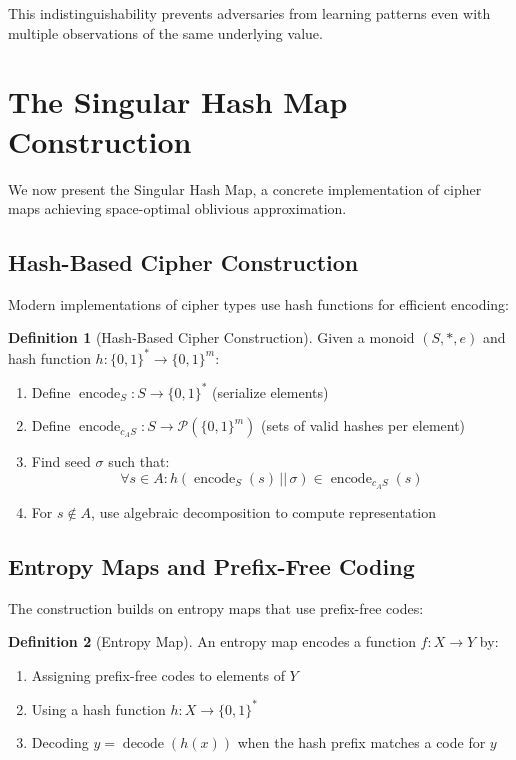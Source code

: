 \documentclass[11pt]{article}
\theoremstyle{definition}
\newtheorem{definition}{Definition}[section]
\theoremstyle{plain}
\theoremstyle{remark}
\newcommand{\catop}{\,||\,}
\newcommand{\cipher}[1]{c_{#1}}
\newcommand{\encode}{\operatorname{encode}}
\newcommand{\Decode}{\operatorname{decode}}
\begin{document}
This indistinguishability prevents adversaries from learning patterns even with multiple observations of the same underlying value.

\section{The Singular Hash Map Construction}
\label{sec:singular-hash}

We now present the Singular Hash Map, a concrete implementation of cipher maps achieving space-optimal oblivious approximation.

\subsection{Hash-Based Cipher Construction}

Modern implementations of cipher types use hash functions for efficient encoding:

\begin{definition}[Hash-Based Cipher Construction]
\label{def:hash-construction}
Given a monoid $(S, *, e)$ and hash function $h: \{0,1\}^* \to \{0,1\}^m$:
\begin{enumerate}
\item Define $\encode_S: S \to \{0,1\}^*$ (serialize elements)
\item Define $\encode_{\cipher{A}S}: S \to \mathcal{P}(\{0,1\}^m)$ (sets of valid hashes per element)
\item Find seed $\sigma$ such that:
   $$\forall s \in A: h(\encode_S(s) \catop \sigma) \in \encode_{\cipher{A}S}(s)$$
\item For $s \notin A$, use algebraic decomposition to compute representation
\end{enumerate}
\end{definition}

\subsection{Entropy Maps and Prefix-Free Coding}

The construction builds on entropy maps that use prefix-free codes:

\begin{definition}[Entropy Map]
\label{def:entropy-map}
An entropy map encodes a function $f : X \to Y$ by:
\begin{enumerate}
\item Assigning prefix-free codes to elements of $Y$
\item Using a hash function $h : X \to \{0,1\}^*$
\item Decoding $y = \Decode(h(x))$ when the hash prefix matches a code for $y$
\end{enumerate}
\end{definition}
\end{document}
